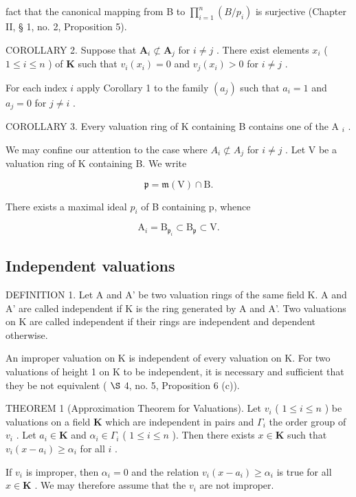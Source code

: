 fact that the canonical mapping from B to \(\prod_{i=1}^{n} (B/p_i)\) is surjective (Chapter II, § 1, no. 2, Proposition 5).

COROLLARY 2. Suppose that \(\mathbf{A}_i \not\subset \mathbf{A}_j\) for \(i \neq j\) . There exist elements \(x_i\) ( \(1 \leqslant i \leqslant n\) ) of \(\mathbf{K}\) such that \(v_i(x_i) = 0\) and \(v_j(x_i) > 0\) for \(i \neq j\) .

For each index \(i\) apply Corollary 1 to the family \((a_{j})\) such that \(a_{i} = 1\) and \(a_{j} = 0\) for \(j \neq i\) .

COROLLARY 3. Every valuation ring of K containing B contains one of the A \(_{i}\) .

We may confine our attention to the case where \(A_{i} \not\subset A_{j}\) for \(i \neq j\) . Let V be a valuation ring of K containing B. We write

\[
\mathfrak {p} = \mathfrak {m} (\mathrm{V}) \cap \mathrm{B}.
\]

There exists a maximal ideal \(p_{i}\) of B containing p, whence

\[
\mathrm{A} _ {i} = \mathrm{B} _ {\mathfrak {p} _ {i}} \subset \mathrm{B} _ {\mathfrak {p}} \subset \mathrm{V}.
\]

\subsection{Independent valuations}

DEFINITION 1. Let A and A' be two valuation rings of the same field K. A and A' are called independent if K is the ring generated by A and A'. Two valuations on K are called independent if their rings are independent and dependent otherwise.

An improper valuation on K is independent of every valuation on K. For two valuations of height 1 on K to be independent, it is necessary and sufficient that they be not equivalent ( \(\S\) 4, no. 5, Proposition 6 (c)).

THEOREM 1 (Approximation Theorem for Valuations). Let \(v_{i}\) ( \(1 \leqslant i \leqslant n\) ) be valuations on a field \(\mathbf{K}\) which are independent in pairs and \(\Gamma_{i}\) the order group of \(v_{i}\) . Let \(a_{i} \in \mathbf{K}\) and \(\alpha_{i} \in \Gamma_{i}\) ( \(1 \leqslant i \leqslant n\) ). Then there exists \(x \in \mathbf{K}\) such that \(v_{i}(x - a_{i}) \geqslant \alpha_{i}\) for all \(i\) .

If \(v_{i}\) is improper, then \(\alpha_{i} = 0\) and the relation \(v_{i}(x - a_{i}) \geqslant \alpha_{i}\) is true for all \(x \in \mathbf{K}\) . We may therefore assume that the \(v_{i}\) are not improper.

